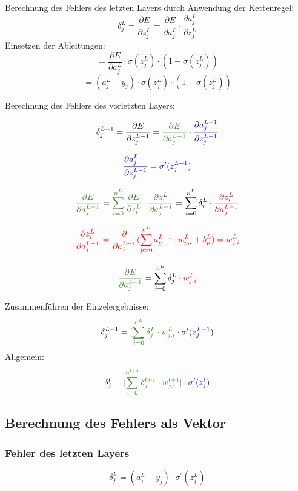 \documentclass{article}
\begin{document}
Berechnung des Fehlers des letzten Layers durch Anwendung der Kettenregel:
\[ \delta_j^L  = \frac{\partial E}{\partial z_j^L}
= \frac{\partial E}{\partial a_j^L} \cdot \frac{\partial a_j^L}{\partial z_j^L}\]
Einsetzen der Ableitungen:
\[ = \frac{\partial E}{\partial a_j^L} \cdot \sigma (z_j^L) \cdot (1 - \sigma (z_j^L)) \]
\[ = (a_j^L - y_j) \cdot \sigma (z_j^L) \cdot (1 - \sigma (z_j^L)) \]

Berechnung des Fehlers des vorletzten Layers:

\[ \delta_j^{L-1}  = \frac{\partial E}{\partial z_j^{L-1}} 
= \textcolor{OliveGreen}{\frac{\partial E}{\partial a_j^{L-1}}} \cdot \textcolor{blue}{\frac{\partial a_j^{L-1}}{\partial z_j^{L-1}}} \]

\[ \textcolor{blue}{\frac{\partial a_j^{L-1}}{\partial z_j^{L-1}} = \sigma^{\prime}(z_j^{L-1})} \]

\[ \textcolor{OliveGreen}{ \frac{\partial E}{\partial a_j^{L-1}} = \sum_{i 
= 0}^{n^L} \frac{\partial E}{\partial z_i^L} \cdot \frac{\partial z_i^L}{\partial a_j^{L-1}} }
= \sum_{i = 0}^{n^L} \delta_i^L \cdot \textcolor{red}{ \frac{\partial z_i^L}{\partial a_j^{L-1}} } \]

\[ \textcolor{red}{ \frac{\partial z_i^L}{\partial a_j^{L-1}}
= \frac{\partial}{\partial a_j^{L-1}} (\sum_{p = 0}^{n^L} a_p^{L-1} \cdot w_{p,i}^L + b_p^L) = w_{j, i}^L } \]

\[ \textcolor{OliveGreen}{ \frac{\partial E}{\partial a_j^{L-1}} } = \sum_{i = 0}^{n^L} \delta_j^L \cdot \textcolor{red}{ w_{j,i}^L } \]

Zusammenführen der Einzelergebnisse:
\[ \delta_j^{L-1} = \textcolor{OliveGreen}{[\sum_{i = 0}^{n^{L}} \delta_j^{L} \cdot w_{j,i}^{L} } \cdot \textcolor{blue}{ \sigma^{\prime}(z_j^{L-1}) } \]
Allgemein:
\[ \delta_j^{l} = \textcolor{OliveGreen}{ [\sum_{i = 0}^{n^{l+1}} \delta_j^{l+1} \cdot w_{j,i}^{l+1}] } \cdot \textcolor{blue}{ \sigma^{\prime}(z_j^{l}) } \]


\subsection{Berechnung des Fehlers als Vektor}


\subsubsection{Fehler des letzten Layers}
\[ \delta_j^L = (a_j^L - y_j) \cdot \sigma^{\prime} (z_j^L)  \]
\end{document}
